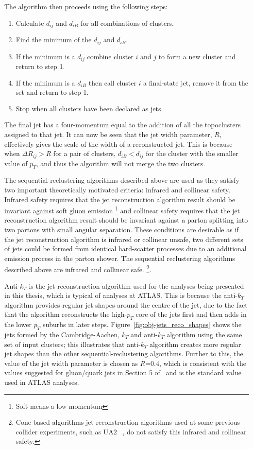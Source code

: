 \noindent The algorithm then proceeds using the following steps:
\vspace{-1em}
\begin{enumerate}[nolistsep]
  \item Calculate $d_{ij}$ and $d_{iB}$ for all combinations of clusters.  
  \item Find the minimum of the $d_{ij}$ and $d_{iB}$. 
  \item If the minimum is a $d_{ij}$ combine cluster $i$ and $j$ to form a new cluster and return to step 1. 
  \item If the minimum is a $d_{iB}$ then call cluster $i$ a final-state jet, remove it from the set and return to step 1.  
  \item Stop when all clusters have been declared as jets. 
\end{enumerate} 
The final jet has a four-momentum equal to the addition of all the topoclusters assigned to that jet.
It can now be seen that the jet width parameter, $R$, effectively gives the scale of the width of a reconstructed jet.
This is because when $\Delta R_{ij} > R$ for a pair of clusters,
$d_{iB} < d_{ij}$ for the cluster with the smaller value of ${p_T}$,
and thus the algorithm will not merge the two clusters.

The sequential reclustering algorithms described above are used as they satisfy two important theoretically motivated criteria:
infrared and collinear safety.
Infrared safety requires that the jet reconstruction algorithm result should be invariant against soft gluon emission \footnote{Soft means a low momentum}
and collinear safety requires that the jet reconstruction algorithm result should be invariant against a parton splitting into two partons with small angular separation.
These conditions are desirable as if the jet reconstruction algorithm is infrared or collinear unsafe,
two different sets of jets could be formed from identical hard-scatter processes
due to an additional emission process in the parton shower.
The sequential reclustering algorithms described above are infrared and collinear safe.
\footnote{Cone-based algorithms jet reconstruction algorithms used at some previous collider experiments,
  such as UA2 ~\cite{obj-jets_reco_UA2}, do not satisfy this infrared and collinear safety.}.

Anti-$k_T$ is the jet reconstruction algorithm used for the analyses being presented in this thesis, which is typical of analyses at ATLAS.
This is because the anti-$k_T$ algorithm provides regular jet shapes around the centre of the jet,
due to the fact that the algorithm reconstructs the high-$p_T$ core of the jets first and then adds in the lower $p_T$ suburbs in later steps.
Figure~\ref{fig:obj-jets_reco_shapes} shows the jets formed by the Cambridge-Aachen, $k_T$ and anti-$k_T$ algorithm using the same set of input clusters;
this illustrates that anti-$k_T$ algorithm creates more regular jet shapes than the other sequential-reclustering algorithms.
Further to this, the value of the jet width parameter is chosen as $R$=0.4,
which is consistent with the values suggested for gluon/quark jets in Section 5 of~\cite{obj-jets_reco_salam}
and is the standard value used in ATLAS analyses.

